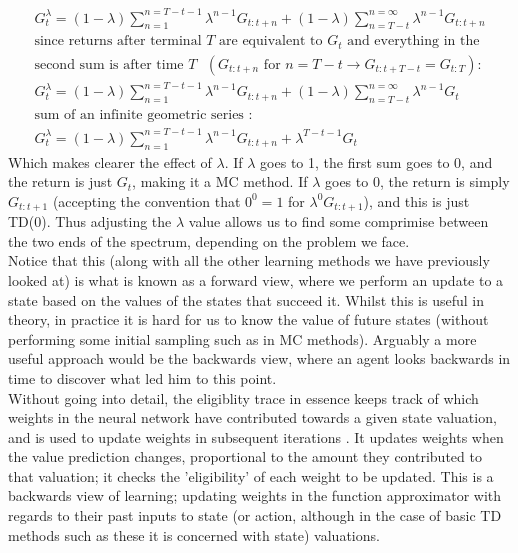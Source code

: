 \documentclass[12pt]{article}
\begin{document}
\begin{gather}
        G^\lambda_t = (1 - \lambda)\sum\limits_{n=1}^{n=T-t-1}\lambda^{n-1}G_{t:t+n} + (1 - \lambda)\sum\limits_{n=T-t}^{n=\infty}\lambda^{n-1}G_{t:t+n}\\
        \text{since returns after terminal }T\text{ are equivalent to }G_t\text{ and everything in the }\nonumber\\
        \text{second sum is after time }T\text{ } (G_{t:t+n} \text{ for } n=T-t \rightarrow G_{t:t+T-t} = G_{t:T}):\nonumber\\
        G^\lambda_t = (1 - \lambda)\sum\limits_{n=1}^{n=T-t-1}\lambda^{n-1}G_{t:t+n} + (1 - \lambda)\sum\limits_{n=T-t}^{n=\infty}\lambda^{n-1}G_t\\
        \text{sum of an infinite geometric series :}\nonumber\\
        G^\lambda_t = (1 - \lambda)\sum\limits_{n=1}^{n=T-t-1}\lambda^{n-1}G_{t:t+n} + \lambda^{T-t-1}G_t
\end{gather}
Which makes clearer the effect of $\lambda$. If $\lambda$ goes to 1, the first sum goes to 0, and the return is just $G_t$, making it a MC method. If $\lambda$ goes to 0, the return is simply $G_{t:t+1}$ (accepting the convention that $0^0 = 1$ for $\lambda^0G_{t:t+1}$), and this is just TD(0). Thus adjusting the $\lambda$ value allows us to find some comprimise between the two ends of the spectrum, depending on the problem we face. \\\newline
Notice that this (along with all the other learning methods we have previously looked at) is what is known as a forward view, where we perform an update to a state based on the values of the states that succeed it. Whilst this is useful in theory, in practice it is hard for us to know the value of future states (without performing some initial sampling such as in MC methods). Arguably a more useful approach would be the backwards view, where an agent looks backwards in time to discover what led him to this point. \\\newline
Without going into detail, the eligiblity trace in essence keeps track of which weights in the neural network have contributed towards a given state valuation, and is used to update weights in subsequent iterations \autocite{rlintrochap12}. It updates weights when the value prediction changes, proportional to the amount they contributed to that valuation; it checks the 'eligibility' of each weight to be updated. This is a backwards view of learning; updating weights in the function approximator with regards to their past inputs to state (or action, although in the case of basic TD methods such as these it is concerned with state) valuations. \\\newline 
\end{document}
